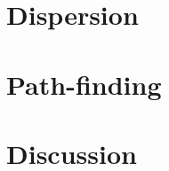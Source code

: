 \documentclass[a4paper]{article}
\begin{document}
\section{Dispersion}
  \label{sec:Dispersion}
  
 
\section{Path-finding}
  \label{sec:Path-finding}
  
 
\section{Discussion}
  \label{sec:Discussion}
  




\end{document}
